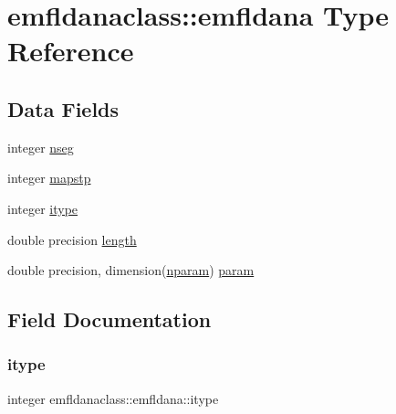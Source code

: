 \hypertarget{structemfldanaclass_1_1emfldana}{}\section{emfldanaclass\+::emfldana Type Reference}
\label{structemfldanaclass_1_1emfldana}
\subsection*{Data Fields}
\begin{DoxyCompactItemize}
\item 
integer \mbox{\hyperlink{structemfldanaclass_1_1emfldana_a9c550d5110930bddd92a57c1d9809e66}{nseg}}
\item 
integer \mbox{\hyperlink{structemfldanaclass_1_1emfldana_a4db12b7d942f212750921af22cc57a48}{mapstp}}
\item 
integer \mbox{\hyperlink{structemfldanaclass_1_1emfldana_a0f9482a746a37ef5287bb0b990c4244c}{itype}}
\item 
double precision \mbox{\hyperlink{structemfldanaclass_1_1emfldana_a94ad15c988b1d3fd9a7eb2902230b501}{length}}
\item 
double precision, dimension(\mbox{\hyperlink{namespaceemfldanaclass_a3ce28adb644b4d35b7f3e9713a275828}{nparam}}) \mbox{\hyperlink{structemfldanaclass_1_1emfldana_a5d95e09d4f314af58ac2b9b0ecbdaa94}{param}}
\end{DoxyCompactItemize}


\subsection{Field Documentation}
\mbox{\label{structemfldanaclass_1_1emfldana_a0f9482a746a37ef5287bb0b990c4244c}} 
\subsubsection{\texorpdfstring{itype}{itype}}
{\footnotesize\ttfamily integer emfldanaclass\+::emfldana\+::itype}

\mbox{\label{structemfldanaclass_1_1emfldana_a94ad15c988b1d3fd9a7eb2902230b501}} 
